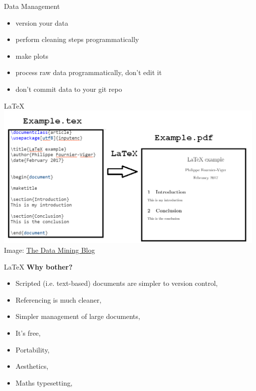 \documentclass{beamer} %
\begin{document}
  \begin{frame}[label=DATA]{Data Management}
    \begin{itemize}
      \item version your data
      \item perform cleaning steps programmatically
      \item make plots
      \item process raw data programmatically, don't edit it
      \item don't commit data to your git repo
    \end{itemize}
  \end{frame}

  \begin{frame}[label=LATEX]{\LaTeX}
    \includegraphics[width=\textwidth]{latex_example.png}
    \tiny
    Image: \href{https://data-mining.philippe-fournier-viger.com/using-latex-for-writing-research-papers/}{The Data Mining Blog}
  \end{frame}

  \begin{frame}{\LaTeX}
    \textbf{Why bother?}
    \begin{itemize}
      \item Scripted (i.e. text-based) documents are simpler to version control,
      \item Referencing is much cleaner,
      \item Simpler management of large documents,
      \item It's free,
      \item Portability,
      \item Aesthetics,
      \item Maths typesetting,
    \end{itemize}
  \end{frame}
\end{document}
